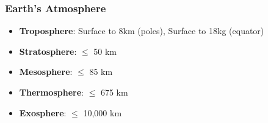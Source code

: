         \subsubsection{Earth's Atmosphere}

            \begin{itemize}
                \item \textbf{Troposphere}: Surface to 8km (poles), Surface to 18kg (equator)
                \item \textbf{Stratosphere}: $\leq$ 50 km
                \item \textbf{Mesosphere}: $\leq$ 85 km
                \item \textbf{Thermosphere}: $\leq$ 675 km
                \item \textbf{Exosphere}: $\leq$ 10,000 km 
            \end{itemize}


